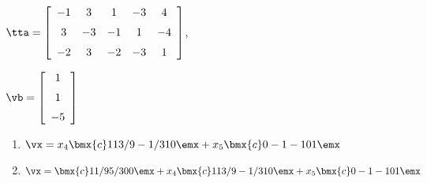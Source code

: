 {$\tta = \left[ \begin {array}{ccccc} -1&3&1&-3&4\\\noalign{\medskip}3&-3&-1&1
&-4\\\noalign{\medskip}-2&3&-2&-3&1\end {array} \right] $, 

$\vb=\left[ \begin {array}{c} 1\\\noalign{\medskip}1\\\noalign{\medskip}-5
\end {array} \right] $}
{\begin{enumerate}
\item	 $\vx=x_4\bmx{c}1\\ 13/9 \\-1/3 \\1\\0\emx+x_5\bmx{c} 0\\ -1 \\-1\\0\\1 \emx$

\item	$\vx=\bmx{c} 1\\ 1/9 \\ 5/3 \\ 0\\ 0  \emx + x_4\bmx{c}1\\ 13/9 \\ -1/3 \\1\\0\emx+x_5\bmx{c} 0\\ -1 \\-1\\0\\1 \emx$
\end{enumerate}}




